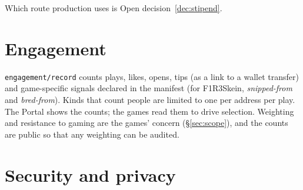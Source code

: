 \documentclass[11pt]{article}
\theoremstyle{definition}
\theoremstyle{remark}
\newcommand{\code}[1]{\texttt{#1}}
\begin{document}
Which route production uses is Open decision~\ref{dec:stipend}.

\section{Engagement}\label{sec:engagement}\label{sec:engagementsec}

\code{engagement/record} counts plays, likes, opens, tips (as a link to a wallet
transfer) and game-specific signals declared in the manifest (for F1R3Skein,
\emph{snipped-from} and \emph{bred-from}). Kinds that count people are limited to one
per address per play. The Portal shows the counts; the games read them to drive
selection. Weighting and resistance to gaming are the games' concern
(\S\ref{sec:scope}), and the counts are public so that any weighting can be audited.

\section{Security and privacy}\label{sec:security}
\end{document}
